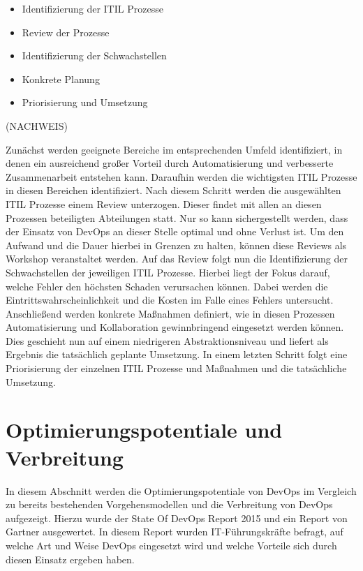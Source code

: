 \begin{itemize}
\item Identifizierung der ITIL Prozesse
\item Review der Prozesse
\item Identifizierung der Schwachstellen
\item Konkrete Planung
\item Priorisierung und Umsetzung
\end{itemize}

(NACHWEIS)

Zunächst werden geeignete Bereiche im entsprechenden Umfeld identifiziert, in denen ein ausreichend großer Vorteil durch Automatisierung und verbesserte Zusammenarbeit entstehen kann. Daraufhin werden die wichtigsten ITIL Prozesse in diesen Bereichen identifiziert. Nach diesem Schritt werden die ausgewählten ITIL Prozesse einem Review unterzogen. Dieser findet mit allen an diesen Prozessen beteiligten Abteilungen statt. Nur so kann sichergestellt werden, dass der Einsatz von DevOps an dieser Stelle optimal und ohne Verlust ist. Um den Aufwand und die Dauer hierbei in Grenzen zu halten, können diese Reviews als Workshop veranstaltet werden. Auf das Review folgt nun die Identifizierung der Schwachstellen der jeweiligen ITIL Prozesse. Hierbei liegt der Fokus darauf, welche Fehler den höchsten Schaden verursachen können. Dabei werden die Eintrittswahrscheinlichkeit und die Kosten im Falle eines Fehlers untersucht. Anschließend werden konkrete Maßnahmen definiert, wie in diesen Prozessen Automatisierung und Kollaboration gewinnbringend eingesetzt werden können. Dies geschieht nun auf einem niedrigeren Abstraktionsniveau und liefert als Ergebnis die tatsächlich geplante Umsetzung. In einem letzten Schritt folgt eine Priorisierung der einzelnen ITIL Prozesse und Maßnahmen und die tatsächliche Umsetzung.


\section{Optimierungspotentiale und Verbreitung} %
In diesem Abschnitt werden die Optimierungspotentiale von DevOps im Vergleich zu bereits bestehenden Vorgehensmodellen und die Verbreitung von DevOps aufgezeigt. Hierzu wurde der \glqq State Of DevOps Report 2015\grqq \parencite[][]{DevOpsSODR:2015} und ein Report von Gartner \parencite[Vgl.][]{Gartner:2015} ausgewertet. In diesem Report wurden IT-Führungskräfte befragt, auf welche Art und Weise DevOps eingesetzt wird und welche Vorteile sich durch diesen Einsatz ergeben haben.

